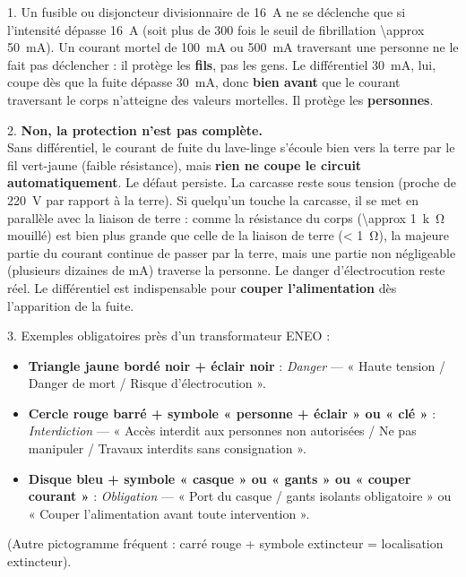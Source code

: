 \documentclass[11pt]{article}
\begin{document}
\begin{corrige}[Exercice]
1. Un fusible ou disjoncteur divisionnaire de \SI{16}{A} ne se déclenche que si l'intensité dépasse \SI{16}{A} (soit plus de 300 fois le seuil de fibrillation \SI{\approx 50}{mA}). Un courant mortel de \SI{100}{mA} ou \SI{500}{mA} traversant une personne ne le fait pas déclencher : il protège les \textbf{fils}, pas les gens. Le différentiel \SI{30}{mA}, lui, coupe dès que la fuite dépasse \SI{30}{mA}, donc \textbf{bien avant} que le courant traversant le corps n'atteigne des valeurs mortelles. Il protège les \textbf{personnes}.

2. \textbf{Non, la protection n'est pas complète.}\\
Sans différentiel, le courant de fuite du lave-linge s'écoule bien vers la terre par le fil vert-jaune (faible résistance), mais \textbf{rien ne coupe le circuit automatiquement}. Le défaut persiste. La carcasse reste sous tension (proche de \SI{220}{V} par rapport à la terre). Si quelqu'un touche la carcasse, il se met en parallèle avec la liaison de terre : comme la résistance du corps (\SI{\approx 1}{k\ohm} mouillé) est bien plus grande que celle de la liaison de terre (\SI{< 1}{\ohm}), la majeure partie du courant continue de passer par la terre, mais une partie non négligeable (plusieurs dizaines de mA) traverse la personne. Le danger d'électrocution reste réel. Le différentiel est indispensable pour \textbf{couper l'alimentation} dès l'apparition de la fuite.

3. Exemples obligatoires près d'un transformateur ENEO :\\
\begin{itemize}
\item \textbf{Triangle jaune bordé noir + éclair noir} : \textit{Danger} — « Haute tension / Danger de mort / Risque d'électrocution ».
\item \textbf{Cercle rouge barré + symbole « personne + éclair » ou « clé »} : \textit{Interdiction} — « Accès interdit aux personnes non autorisées / Ne pas manipuler / Travaux interdits sans consignation ».
\item \textbf{Disque bleu + symbole « casque » ou « gants » ou « couper courant »} : \textit{Obligation} — « Port du casque / gants isolants obligatoire » ou « Couper l'alimentation avant toute intervention ».
\end{itemize}
(Autre pictogramme fréquent : carré rouge + symbole extincteur = localisation extincteur).
\end{corrige}
\end{document}
